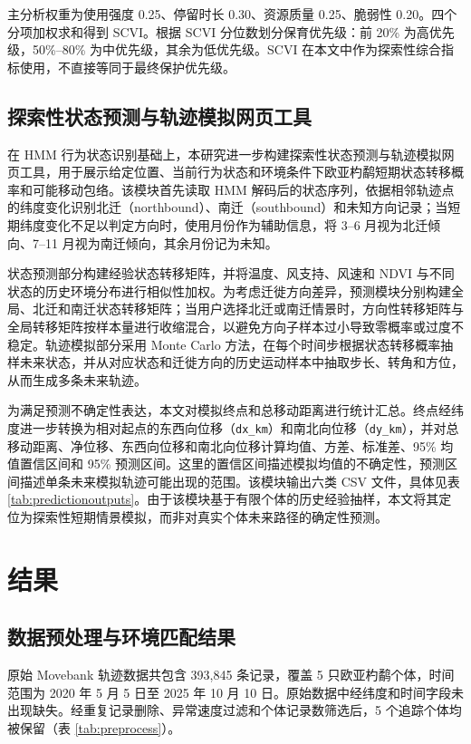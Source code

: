 \documentclass[UTF8,a4paper,12pt]{ctexart}
\begin{document}
主分析权重为使用强度 0.25、停留时长 0.30、资源质量 0.25、脆弱性 0.20。四个分项加权求和得到 SCVI。根据 SCVI 分位数划分保育优先级：前 20\% 为高优先级，50\%--80\% 为中优先级，其余为低优先级。SCVI 在本文中作为探索性综合指标使用，不直接等同于最终保护优先级。

\subsection{探索性状态预测与轨迹模拟网页工具}

在 HMM 行为状态识别基础上，本研究进一步构建探索性状态预测与轨迹模拟网页工具，用于展示给定位置、当前行为状态和环境条件下欧亚杓鹬短期状态转移概率和可能移动包络。该模块首先读取 HMM 解码后的状态序列，依据相邻轨迹点的纬度变化识别北迁（northbound）、南迁（southbound）和未知方向记录；当短期纬度变化不足以判定方向时，使用月份作为辅助信息，将 3--6 月视为北迁倾向、7--11 月视为南迁倾向，其余月份记为未知。

状态预测部分构建经验状态转移矩阵，并将温度、风支持、风速和 NDVI 与不同状态的历史环境分布进行相似性加权。为考虑迁徙方向差异，预测模块分别构建全局、北迁和南迁状态转移矩阵；当用户选择北迁或南迁情景时，方向性转移矩阵与全局转移矩阵按样本量进行收缩混合，以避免方向子样本过小导致零概率或过度不稳定。轨迹模拟部分采用 Monte Carlo 方法，在每个时间步根据状态转移概率抽样未来状态，并从对应状态和迁徙方向的历史运动样本中抽取步长、转角和方位，从而生成多条未来轨迹。

为满足预测不确定性表达，本文对模拟终点和总移动距离进行统计汇总。终点经纬度进一步转换为相对起点的东西向位移（\texttt{dx\_km}）和南北向位移（\texttt{dy\_km}），并对总移动距离、净位移、东西向位移和南北向位移计算均值、方差、标准差、95\% 均值置信区间和 95\% 预测区间。这里的置信区间描述模拟均值的不确定性，预测区间描述单条未来模拟轨迹可能出现的范围。该模块输出六类 CSV 文件，具体见表 \ref{tab:predictionoutputs}。由于该模块基于有限个体的历史经验抽样，本文将其定位为探索性短期情景模拟，而非对真实个体未来路径的确定性预测。

\section{结果}

\subsection{数据预处理与环境匹配结果}

原始 Movebank 轨迹数据共包含 393,845 条记录，覆盖 5 只欧亚杓鹬个体，时间范围为 2020 年 5 月 5 日至 2025 年 10 月 10 日。原始数据中经纬度和时间字段未出现缺失。经重复记录删除、异常速度过滤和个体记录数筛选后，5 个追踪个体均被保留（表 \ref{tab:preprocess}）。
\end{document}
